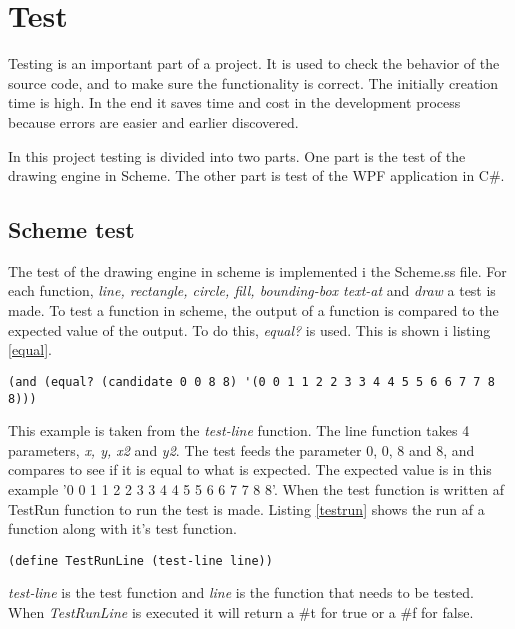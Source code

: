 \chapter{Test}
\label{chp:test}

Testing is an important part of a project. It is used to check the behavior of the source code, and to make sure the functionality is correct. The initially creation time is high. In the end it saves time and cost in the development process because errors are easier and earlier discovered.

In this project testing is divided into two parts. One part is the test of the drawing engine in Scheme. The other part is test of the WPF application in C\#.

\section{Scheme test}
The test of the drawing engine in scheme  is implemented i the Scheme.ss file. For each function, \emph{line, rectangle, circle, fill, bounding-box text-at} and \emph{draw} a test is made. To test a function in scheme, the output of a function is compared to the expected value of the output. To do this, \emph{equal?} is used. This is shown i listing \ref{equal}.

\begin{lstlisting}[caption={Comparison of actual output with the expected output with equal?}, label=equal]
(and (equal? (candidate 0 0 8 8) '(0 0 1 1 2 2 3 3 4 4 5 5 6 6 7 7 8 8)))
\end{lstlisting}

This example is taken from the \emph{test-line} function. The line function takes 4 parameters, \emph{x, y, x2} and \emph{y2}. The test feeds the parameter 0, 0, 8 and 8, and compares to see if it is equal to what is expected. The expected value is in this example '0 0 1 1 2 2 3 3 4 4 5 5 6 6 7 7 8 8'. When the test function is written af TestRun function to run the test is made. Listing \ref{testrun} shows the run af a function along with it's test function. 

\begin{lstlisting}[caption={TestRunLine}, label=testrun]
(define TestRunLine (test-line line))
\end{lstlisting}

\emph{test-line} is the test function and \emph{line} is the function that needs to be tested. When \emph{TestRunLine} is executed it will return a \#t for true or a \#f for false.

